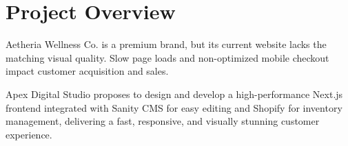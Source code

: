 \section{Project Overview}
Aetheria Wellness Co. is a premium brand, but its current website lacks the matching visual quality. Slow page loads and non-optimized mobile checkout impact customer acquisition and sales.

\parbreak
Apex Digital Studio proposes to design and develop a high-performance Next.js frontend integrated with Sanity CMS for easy editing and Shopify for inventory management, delivering a fast, responsive, and visually stunning customer experience.

\vspace{0.05in}

